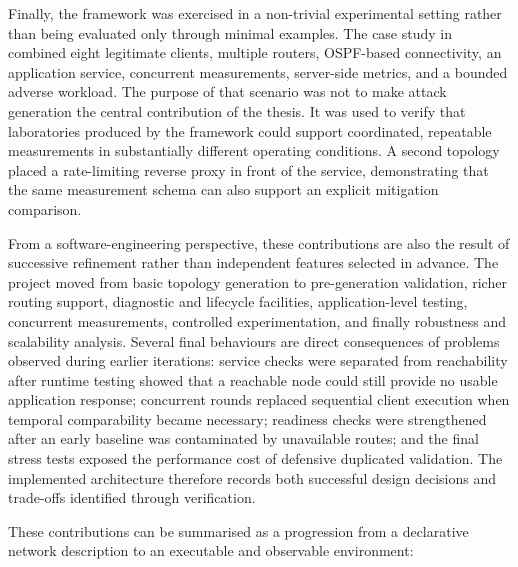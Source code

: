 Finally, the framework was exercised in a non-trivial experimental setting
rather than being evaluated only through minimal examples. The case study in
 combined eight legitimate clients, multiple
routers, OSPF-based connectivity, an application service, concurrent
measurements, server-side metrics, and a bounded adverse workload. The purpose
of that scenario was not to make attack generation the central contribution of
the thesis. It was used to verify that laboratories produced by the framework
could support coordinated, repeatable measurements in substantially different
operating conditions. A second topology placed a rate-limiting reverse proxy in
front of the service, demonstrating that the same measurement schema can also
support an explicit mitigation comparison.

From a software-engineering perspective, these contributions are also the
result of successive refinement rather than independent features selected in
advance. The project moved from basic topology generation to pre-generation
validation, richer routing support, diagnostic and lifecycle facilities,
application-level testing, concurrent measurements, controlled experimentation,
and finally robustness and scalability analysis. Several final behaviours are
direct consequences of problems observed during earlier iterations: service
checks were separated from reachability after runtime testing showed that a
reachable node could still provide no usable application response; concurrent
rounds replaced sequential client execution when temporal comparability became
necessary; readiness checks were strengthened after an early baseline was
contaminated by unavailable routes; and the final stress tests exposed the
performance cost of defensive duplicated validation. The implemented
architecture therefore records both successful design decisions and trade-offs
identified through verification.

These contributions can be summarised as a progression from a declarative
network description to an executable and observable environment:

\begin{center}
\end{center}

